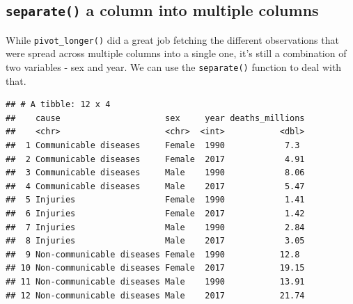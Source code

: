\documentclass[
  12pt,
  krantz2]{krantz}
\makeatletter
\newenvironment{Shaded}{\begin{snugshade}}{\end{snugshade}}
\newcommand{\CommentTok}[1]{\textcolor[rgb]{0.56,0.35,0.01}{\textit{#1}}}
\newcommand{\DataTypeTok}[1]{\textcolor[rgb]{0.13,0.29,0.53}{#1}}
\newcommand{\KeywordTok}[1]{\textcolor[rgb]{0.13,0.29,0.53}{\textbf{#1}}}
\newcommand{\NormalTok}[1]{#1}
\newcommand{\OperatorTok}[1]{\textcolor[rgb]{0.81,0.36,0.00}{\textbf{#1}}}
\newcommand{\OtherTok}[1]{\textcolor[rgb]{0.56,0.35,0.01}{#1}}
\newcommand{\StringTok}[1]{\textcolor[rgb]{0.31,0.60,0.02}{#1}}
\newenvironment{kframe}{%
\medskip{}
\setlength{\fboxsep}{.8em}
 \def\at@end@of@kframe{}%
 \ifinner\ifhmode%
  \def\at@end@of@kframe{\end{minipage}}%
  \begin{minipage}{\columnwidth}%
 \fi\fi%
 \def\FrameCommand##1{\hskip\@totalleftmargin \hskip-\fboxsep
 \colorbox{shadecolor}{##1}\hskip-\fboxsep
     \hskip-\linewidth \hskip-\@totalleftmargin \hskip\columnwidth}%
 \MakeFramed {\advance\hsize-\width
   \@totalleftmargin\z@ \linewidth\hsize
   \@setminipage}}%
 {\par\unskip\endMakeFramed%
 \at@end@of@kframe}
\renewenvironment{Shaded}{\begin{kframe}}{\end{kframe}}
\makeatother
\begin{document}
\hypertarget{separate-a-column-into-multiple-columns}{%
\subsection{\texorpdfstring{\texttt{separate()} a column into multiple columns}{separate() a column into multiple columns}}\label{separate-a-column-into-multiple-columns}}

While \texttt{pivot\_longer()} did a great job fetching the different observations that were spread across multiple columns into a single one, it's still a combination of two variables - sex and year.
We can use the \texttt{separate()} function to deal with that.

\begin{Shaded}
\end{Shaded}

\begin{verbatim}
## # A tibble: 12 x 4
##    cause                     sex     year deaths_millions
##    <chr>                     <chr>  <int>           <dbl>
##  1 Communicable diseases     Female  1990            7.3 
##  2 Communicable diseases     Female  2017            4.91
##  3 Communicable diseases     Male    1990            8.06
##  4 Communicable diseases     Male    2017            5.47
##  5 Injuries                  Female  1990            1.41
##  6 Injuries                  Female  2017            1.42
##  7 Injuries                  Male    1990            2.84
##  8 Injuries                  Male    2017            3.05
##  9 Non-communicable diseases Female  1990           12.8 
## 10 Non-communicable diseases Female  2017           19.15
## 11 Non-communicable diseases Male    1990           13.91
## 12 Non-communicable diseases Male    2017           21.74
\end{verbatim}
\end{document}

